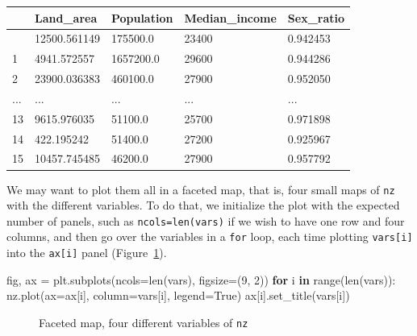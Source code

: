\documentclass[
  letterpaper,
]{krantz}
\newenvironment{Shaded}{\begin{snugshade}}{\end{snugshade}}
\newcommand{\BuiltInTok}[1]{\textcolor[rgb]{0.00,0.23,0.31}{#1}}
\newcommand{\ControlFlowTok}[1]{\textcolor[rgb]{0.00,0.23,0.31}{\textbf{#1}}}
\newcommand{\DecValTok}[1]{\textcolor[rgb]{0.68,0.00,0.00}{#1}}
\newcommand{\KeywordTok}[1]{\textcolor[rgb]{0.00,0.23,0.31}{\textbf{#1}}}
\newcommand{\NormalTok}[1]{\textcolor[rgb]{0.00,0.23,0.31}{#1}}
\newcommand{\OperatorTok}[1]{\textcolor[rgb]{0.37,0.37,0.37}{#1}}
\newcommand{\VariableTok}[1]{\textcolor[rgb]{0.07,0.07,0.07}{#1}}
\begin{document}
\begin{longtable}[]{@{}lllll@{}}
\toprule\noalign{}
& Land\_area & Population & Median\_income & Sex\_ratio \\
\midrule\noalign{}
\endhead
\bottomrule\noalign{}
\endlastfoot
0 & 12500.561149 & 175500.0 & 23400 & 0.942453 \\
1 & 4941.572557 & 1657200.0 & 29600 & 0.944286 \\
2 & 23900.036383 & 460100.0 & 27900 & 0.952050 \\
... & ... & ... & ... & ... \\
13 & 9615.976035 & 51100.0 & 25700 & 0.971898 \\
14 & 422.195242 & 51400.0 & 27200 & 0.925967 \\
15 & 10457.745485 & 46200.0 & 27900 & 0.957792 \\
\end{longtable}

We may want to plot them all in a faceted map, that is, four small maps
of \texttt{nz} with the different variables. To do that, we initialize
the plot with the expected number of panels, such as
\texttt{ncols=len(vars)} if we wish to have one row and four columns,
and then go over the variables in a \texttt{for} loop, each time
plotting \texttt{vars{[}i{]}} into the \texttt{ax{[}i{]}} panel
(Figure~\ref{fig-faceted-map}).

\begin{Shaded}
\begin{Highlighting}[]
\NormalTok{fig, ax }\OperatorTok{=}\NormalTok{ plt.subplots(ncols}\OperatorTok{=}\BuiltInTok{len}\NormalTok{(}\BuiltInTok{vars}\NormalTok{), figsize}\OperatorTok{=}\NormalTok{(}\DecValTok{9}\NormalTok{, }\DecValTok{2}\NormalTok{))}
\ControlFlowTok{for}\NormalTok{ i }\KeywordTok{in} \BuiltInTok{range}\NormalTok{(}\BuiltInTok{len}\NormalTok{(}\BuiltInTok{vars}\NormalTok{)):}
\NormalTok{    nz.plot(ax}\OperatorTok{=}\NormalTok{ax[i], column}\OperatorTok{=}\BuiltInTok{vars}\NormalTok{[i], legend}\OperatorTok{=}\VariableTok{True}\NormalTok{)}
\NormalTok{    ax[i].set\_title(}\BuiltInTok{vars}\NormalTok{[i])}
\end{Highlighting}
\end{Shaded}

\begin{figure}[H]


\caption{\label{fig-faceted-map}Faceted map, four different variables of
\texttt{nz}}

\end{figure}%
\end{document}
